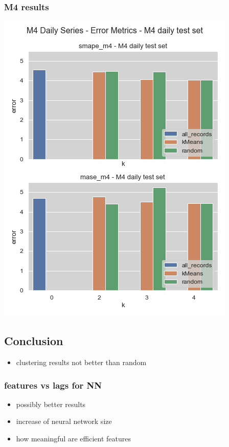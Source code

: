 \documentclass[11pt]{article}
\begin{document}
\subsubsection*{M4 results}
\label{sec:orgfae6af1}
\begin{center}
\includegraphics[width=.9\linewidth]{./img/daily_m4_results.png}
\end{center}
\subsection*{Conclusion}
\label{sec:org0b20936}
\begin{itemize}
\item clustering results not better than random
\end{itemize}
\subsubsection*{features vs lags for NN}
\label{sec:org105c8f2}
\begin{itemize}
\item possibly better results
\item increase of neural network size
\item how meaningful are efficient features
\end{itemize}
\end{document}
